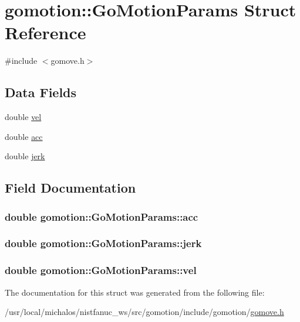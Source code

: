 \hypertarget{structgomotion_1_1_go_motion_params}{\section{gomotion\-:\-:Go\-Motion\-Params Struct Reference}
\label{structgomotion_1_1_go_motion_params}
}


{\ttfamily \#include $<$gomove.\-h$>$}

\subsection*{Data Fields}
\begin{DoxyCompactItemize}
\item 
double \hyperlink{structgomotion_1_1_go_motion_params_a84993ded24232568329b81331e4b09db}{vel}
\item 
double \hyperlink{structgomotion_1_1_go_motion_params_ab527b270eae069c523e3c16135a587fd}{acc}
\item 
double \hyperlink{structgomotion_1_1_go_motion_params_a82304cfd33f8bcb9c9f0eddf9904c8da}{jerk}
\end{DoxyCompactItemize}


\subsection{Field Documentation}
\hypertarget{structgomotion_1_1_go_motion_params_ab527b270eae069c523e3c16135a587fd}{
\subsubsection[{acc}]{\setlength{\rightskip}{0pt plus 5cm}double gomotion\-::\-Go\-Motion\-Params\-::acc}}\label{structgomotion_1_1_go_motion_params_ab527b270eae069c523e3c16135a587fd}
\hypertarget{structgomotion_1_1_go_motion_params_a82304cfd33f8bcb9c9f0eddf9904c8da}{
\subsubsection[{jerk}]{\setlength{\rightskip}{0pt plus 5cm}double gomotion\-::\-Go\-Motion\-Params\-::jerk}}\label{structgomotion_1_1_go_motion_params_a82304cfd33f8bcb9c9f0eddf9904c8da}
\hypertarget{structgomotion_1_1_go_motion_params_a84993ded24232568329b81331e4b09db}{
\subsubsection[{vel}]{\setlength{\rightskip}{0pt plus 5cm}double gomotion\-::\-Go\-Motion\-Params\-::vel}}\label{structgomotion_1_1_go_motion_params_a84993ded24232568329b81331e4b09db}


The documentation for this struct was generated from the following file\-:\begin{DoxyCompactItemize}
\item 
/usr/local/michalos/nistfanuc\-\_\-ws/src/gomotion/include/gomotion/\hyperlink{gomove_8h}{gomove.\-h}\end{DoxyCompactItemize}
